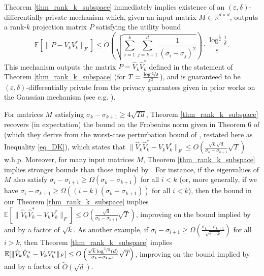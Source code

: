 \documentclass[11pt,letterpaper]{article}
\renewcommand{\epsilon}{\varepsilon}
\begin{document}
Theorem \ref{thm_rank_k_subspace} immediately implies existence of an $(\epsilon,\delta)$-differentially private mechanism which, given an input matrix $M \in \mathbb{R}^{d \times d}$, outputs a rank-$k$ projection matrix $P$ satisfying the utility bound $$\mathbb{E}[\|P-  V_k V_k^\ast  \|_F] \leq \tilde{O}\left(\sqrt{\sum_{i=1}^k \sum_{j= k+1}^d \frac{1}{(\sigma_i - \sigma_j)^2}}\right)\cdot \frac{\log^{\frac{1}{2}} \frac{1}{\delta}}{\epsilon}.$$
%
 This mechanism outputs the matrix $P = \hat{V}_k\hat{V}_k^\ast$ defined in the statement of Theorem \ref{thm_rank_k_subspace} (for $T = \frac{\log \nicefrac{1}{\delta}}{\epsilon^2}$), and is guaranteed to be $(\epsilon,\delta)$-differentially private from the privacy guarantees given in prior works on the Gaussian mechanism (see e.g. \cite{dwork2014analyze}).



For matrices $M$ satisfying  $\sigma_k - \sigma_{k+1} \geq 4\sqrt{Td}$, Theorem \ref{thm_rank_k_subspace} recovers (in expectation) the bound on the Frobenius norm given in Theorem 6 of \cite{dwork2014analyze} (which they derive from the worst-case perturbation bound of \cite{davis1970rotation}, restated here as Inequality \eqref{eq_DK}), which states that $\|\hat{V}_k\hat{V}_k^\ast - V_k V_k^\ast \|_F \leq O\left(\frac{\sqrt{k}\sqrt{d}}{\sigma_k - \sigma_{k+1}} \sqrt{T}\right)$ w.h.p. 
% 
Moreover, for many input matrices $M$, Theorem \ref{thm_rank_k_subspace} implies stronger bounds than those implied by \cite{dwork2014analyze, davis1970rotation}.
%
 For instance, if the eigenvalues of $M$ also satisfy $\sigma_i - \sigma_{i+1} \geq \Omega(\sigma_k - \sigma_{k+1})$ for all $i < k$ (or, more generally, if we have $\sigma_i - \sigma_{k+1} \geq \Omega((i-k)(\sigma_k - \sigma_{k+1}))$ for all $i<k$), then the bound in our Theorem \ref{thm_rank_k_subspace} implies $\mathbb{E}[\|\hat{V}_k\hat{V}_k^\ast - V_k V_k^\ast \|_F] \leq O\left(\frac{\sqrt{d}}{\sigma_k- \sigma_{k+1}} \sqrt{T}\right)$, improving on the bound implied by \cite{davis1970rotation} and \cite{dwork2014analyze} by a factor of $\sqrt{k}$.
  As another example, if $\sigma_i - \sigma_{i+1} \geq \Omega\left(\frac{\sigma_k - \sigma_{k+1}}{\sqrt{i-k}}\right)$ for all $i > k$,  then Theorem \ref{thm_rank_k_subspace} implies $\mathbb{E}[\|\hat{V}_k\hat{V}_k^\ast - V_k V_k^\ast \|_F] \leq O\left(\frac{\sqrt{k} \log^{\nicefrac{1}{2}}(d)}{\sigma_k- \sigma_{k+1}} \sqrt{T}\right)$, improving on the bound implied by \cite{davis1970rotation} and \cite{dwork2014analyze} by a factor of $\tilde{O}(\sqrt{d})$.
\end{document}
